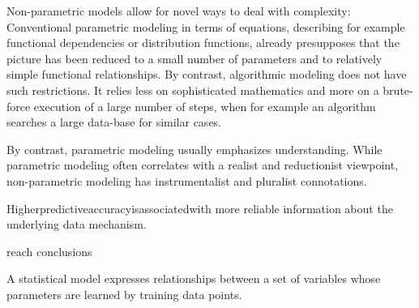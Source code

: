 \documentclass[authoryear,review,3p]{elsarticle}
\begin{document}
Non-parametric models allow for novel ways to deal with complexity:
Conventional parametric modeling in terms of equations, describing for example functional dependencies or distribution functions, already presupposes that the picture has been reduced to a small number of parameters and to relatively simple functional relationships. By contrast, algorithmic modeling does not have such restrictions. It relies less on sophisticated mathematics and more on a brute-force execution of a large number of steps, when for example an algorithm searches a large data-base for similar cases. 

By contrast, parametric modeling usually emphasizes understanding. While parametric modeling often correlates with a realist and reductionist viewpoint, non-parametric modeling has instrumentalist and pluralist connotations.

Higherpredictiveaccuracyisassociatedwith more reliable information about the underlying data mechanism.



reach conclusions


A statistical model expresses relationships between a set of variables
whose parameters are learned by training data points.
\end{document}
